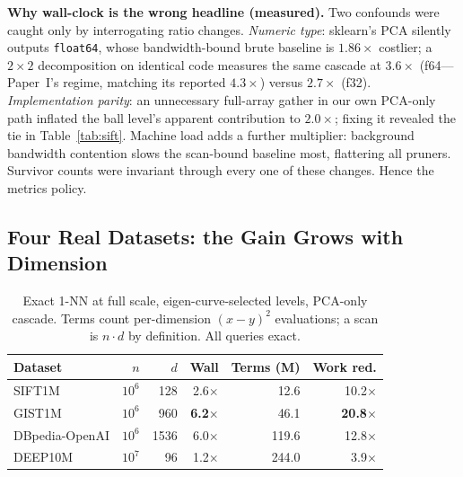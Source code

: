\documentclass[sigconf,nonacm]{acmart}
\begin{document}
\textbf{Why wall-clock is the wrong headline (measured).} Two confounds were
caught only by interrogating ratio changes. \emph{Numeric type}: sklearn's
PCA silently outputs \texttt{float64}, whose bandwidth-bound brute baseline
is $1.86\times$ costlier; a $2\times2$ decomposition on identical code
measures the same cascade at $3.6\times$ (f64---Paper~I's regime, matching
its reported $4.3\times$) versus $2.7\times$ (f32). \emph{Implementation
parity}: an unnecessary full-array gather in our own PCA-only path inflated
the ball level's apparent contribution to $2.0\times$; fixing it revealed
the tie in Table~\ref{tab:sift}. Machine load adds a further multiplier:
background bandwidth contention slows the scan-bound baseline most,
flattering all pruners. Survivor counts were invariant through every one of
these changes. Hence the metrics policy.

\subsection{Four Real Datasets: the Gain Grows with Dimension}
\label{sec:datasets}

\begin{table}[t]
\caption{Exact 1-NN at full scale, eigen-curve-selected levels, PCA-only
cascade. Terms count per-dimension $(x{-}y)^2$ evaluations; a scan is
$n \cdot d$ by definition. All queries exact.}
\label{tab:datasets}
\small
\begin{tabular}{@{}lrrrrr@{}}
\toprule
Dataset & $n$ & $d$ & Wall & Terms (M) & Work red. \\
\midrule
SIFT1M & $10^6$ & 128 & 2.6$\times$ & 12.6 & 10.2$\times$ \\
GIST1M & $10^6$ & 960 & \textbf{6.2$\times$} & 46.1 & \textbf{20.8$\times$} \\
DBpedia-OpenAI & $10^6$ & 1536 & 6.0$\times$ & 119.6 & 12.8$\times$ \\
DEEP10M & $10^7$ & 96 & 1.2$\times$ & 244.0 & 3.9$\times$ \\
\bottomrule
\end{tabular}
\end{table}
\end{document}
